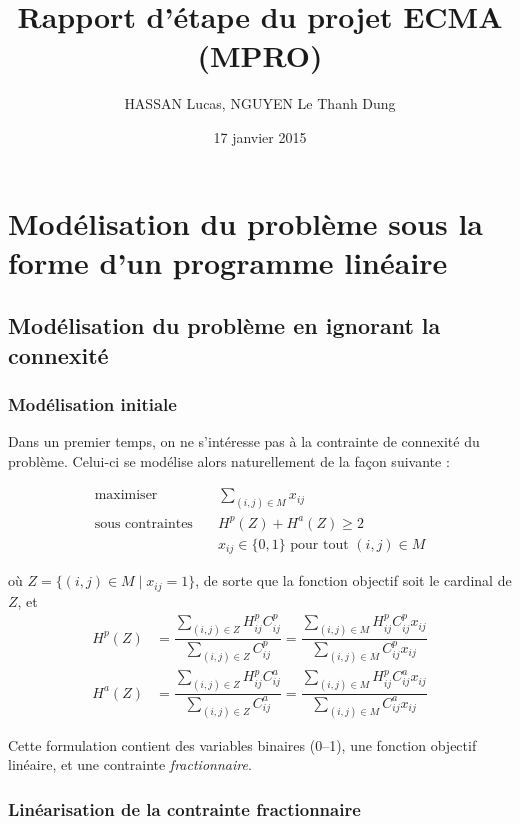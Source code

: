 \documentclass[a4paper,11pt] {article}
\author{HASSAN Lucas, NGUYEN Le Thanh Dung}
\date{17 janvier 2015}
\begin{document}
\title{Rapport d'étape du projet ECMA (MPRO)}

\maketitle{}

\section{Modélisation du problème sous la forme d'un programme linéaire}

\subsection{Modélisation du problème en ignorant la connexité}

\subsubsection{Modélisation initiale}

Dans un premier temps, on ne s'intéresse pas à la contrainte de connexité du problème.
Celui-ci se modélise alors naturellement de la façon suivante : 

\begin{align*}
\text{maximiser} &\quad \sum_{(i,j)\in M} x_{ij} \\
\text{sous contraintes} &\quad H^p(Z)+H^a(Z) \geq 2 \\
&\quad x_{ij} \in \{0,1\} \text{ pour tout } (i,j) \in M
\end{align*}

où $Z = \{(i,j) \in M \mid x_{ij} = 1\}$, de sorte que la fonction
objectif soit le cardinal de $Z$, et
\begin{align*}
H^p(Z) &= \dfrac{\displaystyle\sum_{(i,j)\in Z} H^p_{ij}C^p_{ij}}{\displaystyle\sum_{(i,j)\in Z} C^p_{ij}} = \dfrac{\displaystyle\sum_{(i,j)\in M} H^p_{ij}C^p_{ij}x_{ij}}{\displaystyle\sum_{(i,j)\in M} C^p_{ij}x_{ij}} \\
H^a(Z) &= \dfrac{\displaystyle\sum_{(i,j)\in Z} H^p_{ij}C^a_{ij}}{\displaystyle\sum_{(i,j)\in Z} C^a_{ij}} = \dfrac{\displaystyle\sum_{(i,j)\in M} H^p_{ij}C^a_{ij}x_{ij}}{\displaystyle\sum_{(i,j)\in M} C^a_{ij}x_{ij}}
\end{align*}

Cette formulation contient des variables binaires (0--1), une fonction
objectif linéaire, et une contrainte \textit{fractionnaire}.

\subsubsection{Linéarisation de la contrainte fractionnaire}
\end{document}
